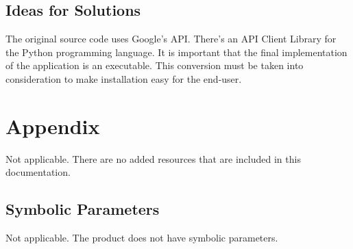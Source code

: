 \documentclass[12pt, titlepage]{article}
\begin{document}
\subsection{Ideas for Solutions}
\hspace{5mm}
The original source code uses Google's API.  There's an API Client Library for the Python programming language. It is important that the final implementation of the application is an executable. This conversion must be taken into consideration to make installation easy for the end-user.

\newpage





\newpage

\section{Appendix}
\color{blue}
Not applicable. There are no added resources that are included in this documentation.
\color{black}

\subsection{Symbolic Parameters}
\color{blue}
Not applicable. The product does not have symbolic parameters.
\color{black}
\end{document}
